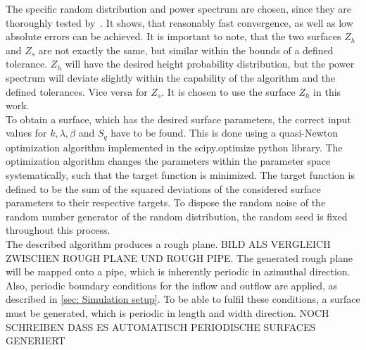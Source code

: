 The specific random distribution and power spectrum are chosen, since they are thoroughly tested by~\cite{perez-rafolsGeneratingRandomlyRough2019}.
It shows, that reasonably fast convergence, as well as low absolute errors can be achieved.
It is important to note, that the two surfaces $Z_h$ and $Z_s$ are not exactly the same, but similar within the bounds of a defined tolerance.
$Z_h$ will have the desired height probability distribution, but the power spectrum will deviate slightly within the capability of the algorithm and the defined tolerances.
Vice versa for $Z_s$.
It is chosen to use the surface $Z_h$ in this work.\\
To obtain a surface, which has the desired surface parameters, the correct input values for $k, \lambda, \beta$ and $S_q$ have to be found.
This is done using a quasi-Newton optimization algorithm implemented in the scipy.optimize python library.
The optimization algorithm changes the parameters within the parameter space systematically, such that the target function is minimized.
The target function is defined to be the sum of the squared deviations of the considered surface parameters to their respective targets.
To dispose the random noise of the random number generator of the random distribution, the random seed is fixed throughout this process.\\
The described algorithm produces a rough plane.
BILD ALS VERGLEICH ZWISCHEN ROUGH PLANE UND ROUGH PIPE.
The generated rough plane will be mapped onto a pipe, which is inherently periodic in azimuthal direction.
Also, periodic boundary conditions for the inflow and outflow are applied, as described in \autoref{sec: Simulation setup}.
To be able to fulfil these conditions, a surface must be generated, which is periodic in length and width direction.
NOCH SCHREIBEN DASS ES AUTOMATISCH PERIODISCHE SURFACES GENERIERT


